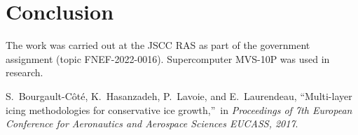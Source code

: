 \documentclass[
11pt,%
tightenlines,%
twoside,%
onecolumn,%
nofloats,%
nobibnotes,%
nofootinbib,%
superscriptaddress,%
noshowpacs,%
centertags]%
{revtex4}
\begin{document}

\section{Conclusion}


\begin{acknowledgments}
The work was carried out at the JSCC RAS as part of the government assignment (topic FNEF-2022-0016). Supercomputer MVS-10P was used in research.
\end{acknowledgments}


\begin{thebibliography}{99}

S.~Bourgault-C\^ot\'e, K.~Hasanzadeh, P.~Lavoie, and E.~Laurendeau, \textquotedblleft Multi-layer icing methodologies for conservative ice growth,\textquotedblright \ in \textit{Proceedings of 7th European Conference for Aeronautics and Aerospace Sciences EUCASS, 2017}.

\end{thebibliography}
\end{document}
